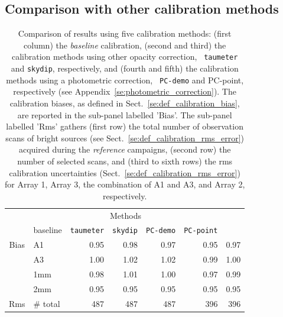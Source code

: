 \documentclass[traditionalabstract]{aa}
\begin{document}
%
%
\subsection{Comparison with other calibration methods}
\label{se:photometry_others}
\begin{table}[!htbp]
\begin{center}
\caption[Comparison of calibration results using five
  methods]{Comparison of results using five calibration
  methods: (first column) the \emph{baseline} calibration, (second and
  third) the calibration methods using other opacity correction, {\tt
  taumeter} and {\tt skydip}, respectively, and
  (fourth and fifth) the calibration methods using a photometric correction, {\tt
  PC-demo} and {PC-point}, respectively (see Appendix~\ref{se:photometric_correction}).  
  The calibration biases, as defined in
  Sect.~\ref{se:def_calibration_bias}, are reported in the sub-panel
  labelled 'Bias'. The sub-panel labelled 'Rms' gathers (first row) the total number of
  observation scans of bright sources (see
  Sect.~\ref{se:def_calibration_rms_error}) acquired during
  the \emph{reference} campaigns, (second row) the number of selected
  scans, and (third to sixth rows) the rms calibration uncertainties
  (Sect.~\ref{se:def_calibration_rms_error}) for Array 1, Array 3, the
  combination of A1 and A3, and Array 2, respectively. }
\label{tab:Calibration_results_all}
\begin{tabular}{clrrrrr}
  \hline\hline
  \noalign{\smallskip}
  \multicolumn{2}{c}{}  &  \multicolumn{5}{c}{Methods} \\\cline{3-7}
  \noalign{\smallskip}
  \multicolumn{2}{c}{Characteristics} &  baseline  & {\small {\tt taumeter}}  & {\small {\tt skydip}}  &  {\small {\tt PC-demo}} & {\small {\tt PC-point}} \\
  \hline
  \noalign{\smallskip}
  Bias &  A1            &   0.95   &  0.98    &  0.97    &   0.95    &  0.97  \\
       &  A3            &   1.00   &  1.02    &  1.02    &   0.99    &  1.00  \\
       &  1mm           &   0.98   &  1.01    &  1.00    &   0.97    &  0.99  \\
       &  2mm           &   0.95   &  0.95    &  0.95    &   0.95    &  0.95  \\
  \hline
  \noalign{\smallskip}
  Rms  &  $\#$ total      &   487    &    487   &    487    &    396    &  396 \\

\end{tabular}
\end{center}
\end{table}
\end{document}
